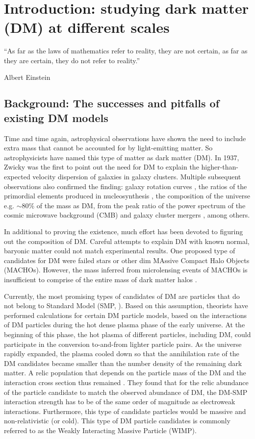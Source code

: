 \chapter{Introduction: studying dark matter (DM) at different 
	scales}		
\label{chapter:1}
\epigraph{``As far as the laws of mathematics refer to reality, they are not 
certain, as far as they are certain, they do not refer to reality.''}{Albert Einstein} 
\doublespacing


\section{Background: The successes and pitfalls of existing DM models}
Time and time again, astrophysical
observations have shown the need to include extra mass that cannot be accounted
for by light-emitting matter. So astrophysicists have named this type
of matter as dark matter (DM). In 1937, Zwicky was the first to point out the
need for DM to explain the
higher-than-expected velocity dispersion of galaxies in galaxy
clusters. Multiple subsequent observations also confirmed the finding: galaxy 
rotation
curves \citep{Rubin1970}, the ratios of the primordial elements produced in nucleosynthesis
\citep{Dar1995}, the composition of the universe e.g. $\sim 80\%$ of the mass
as DM,
from  the peak ratio of the power spectrum of 
the cosmic microwave background (CMB) \citep{Hu1997}
and galaxy cluster mergers \citep{Clowe06}, among
others. 

In additional to proving the existence, much effort has been devoted to figuring 
out the composition of DM.
Careful attempts to explain DM with known normal, baryonic matter could not match 
experimental results. 
One proposed type of candidates for DM were
failed stars or other dim MAssive Compact Halo Objects (MACHOs). 
However, the mass inferred from microlensing events of MACHOs is insufficient
to comprise of the entire mass of dark matter halos 
\citep{Alcock1996}.

Currently, the most promising types of candidates of DM are 
particles that do not belong to Standard Model (SMP,
\citealt{Bertone2005}). 
Based on this assumption, theorists have performed calculations for certain
DM particle models, based on  
the interactions of DM particles during the hot dense plasma phase of the early universe. 
 At the
beginning of this phase, the hot plasma of different particles, including DM, could participate in
the conversion to-and-from lighter particle pairs. As the universe rapidly
expanded, the plasma cooled down so that the
annihilation rate of the DM candidates became smaller than the
number density of the remaining dark matter. 
A relic population that depends on the particle mass of the DM and
the interaction cross section thus remained 
\citep{Griest1988}. They found that for the relic abundance of the particle
candidate to match the observed abundance of DM, the DM-SMP interaction
strength has to be of the same order of magnitude as
electroweak interactions. Furthermore, this type of candidate
particles would be massive and non-relativistic (or cold). 
This type of DM particle candidates is commonly referred to as the Weakly 
Interacting Massive Particle (WIMP). 

